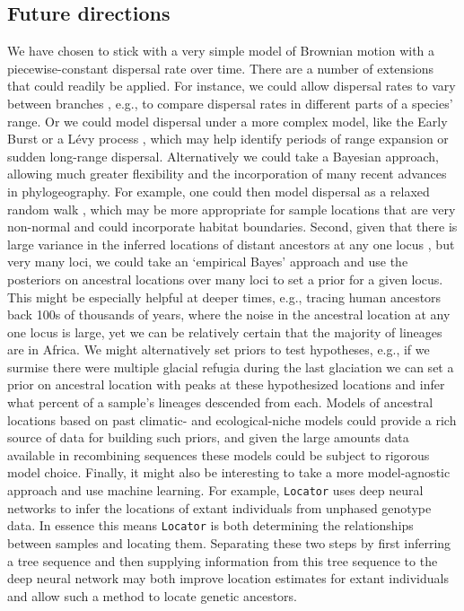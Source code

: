\documentclass[12pt]{article}
\begin{document}
\subsection*{Future directions}

We have chosen to stick with a very simple model of Brownian motion with a piecewise-constant dispersal rate over time.
There are a number of extensions that could readily be applied.
For instance, we could allow dispersal rates to vary between branches \citep{o2006testing}, e.g., to compare dispersal rates in different parts of a species' range.
Or we could model dispersal under a more complex model, like the Early Burst \citep{harmon2010early} or a L{\'e}vy process 
\citep{landis2013phylogenetic}, which may help identify periods of range expansion or sudden long-range dispersal.
Alternatively we could take a Bayesian approach, allowing much greater flexibility and the incorporation of many recent advances in phylogeography.
For example, one could then model dispersal as a relaxed random walk \citep{lemey2010phylogeography}, which may be more appropriate for sample locations that are very non-normal and could incorporate habitat boundaries.
Second, given that there is large variance in the inferred locations of distant ancestors at any one locus \citep{schluter1997likelihood}, but very many loci, we could take an `empirical Bayes' approach and use the posteriors on ancestral locations over many loci to set a prior for a given locus.
This might be especially helpful at deeper times, e.g., tracing human ancestors back 100s of thousands of years, where the noise in the ancestral location at any one locus is large, yet we can be relatively certain that the majority of lineages are in Africa.
We might alternatively set priors to test hypotheses, e.g., if we surmise there were multiple glacial refugia during the last glaciation we can set a prior on ancestral location with peaks at these hypothesized locations and infer what percent of a sample's lineages descended from each.
Models of ancestral locations based on past climatic- and ecological-niche models could provide a rich source of data for building such priors, and given the large amounts data available in recombining sequences these models could be subject to rigorous model choice.
Finally, it might also be interesting to take a more model-agnostic approach and use machine learning.
For example, \texttt{Locator} \citep{battey2020predicting} uses deep neural networks to infer the locations of extant individuals from unphased genotype data.
In essence this means \texttt{Locator} is both determining the relationships between samples and locating them.
Separating these two steps by first inferring a tree sequence and then supplying information from this tree sequence to the deep neural network may both improve location estimates for extant individuals and allow such a method to locate genetic ancestors.
\end{document}
